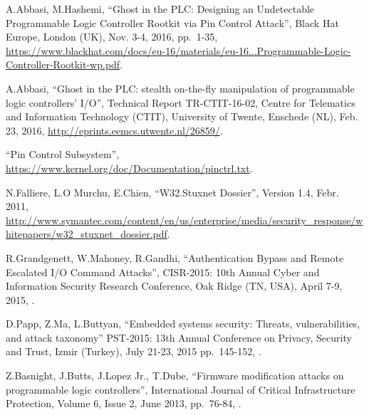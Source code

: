 \begin{thebibliography}{99}

A.Abbasi, M.Hashemi,
``Ghost in the PLC: Designing an Undetectable Programmable Logic Controller Rootkit via Pin Control Attack'',
Black Hat Europe,
London (UK), Nov. 3-4, 2016,
pp.\ 1-35,
\href{https://www.blackhat.com/docs/eu-16/materials/eu-16-Abbasi-Ghost-In-The-PLC-Designing-An-Undetectable-Programmable-Logic-Controller-Rootkit-wp.pdf}{https://www.blackhat.com/docs/eu-16/materials/eu-16...Programmable-Logic-Controller-Rootkit-wp.pdf}.


A.Abbasi,
``Ghost in the PLC: stealth on-the-fly manipulation of programmable logic controllers’ I/O'',
Technical Report TR-CTIT-16-02, Centre for Telematics and Information Technology (CTIT), University of Twente,
Enschede (NL), Feb. 23, 2016,
\url{http://eprints.eemcs.utwente.nl/26859/}.

``Pin Control Subsystem'',
\url{https://www.kernel.org/doc/Documentation/pinctrl.txt}.

N.Falliere, L.O Murchu, E.Chien,
``W32.Stuxnet  Dossier'',
Version 1.4, Febr. 2011,
\url{http://www.symantec.com/content/en/us/enterprise/media/security_response/whitepapers/w32_stuxnet_dossier.pdf}.

R.Grandgenett, W.Mahoney, R.Gandhi,
``Authentication Bypass and Remote Escalated I/O Command Attacks'',
CISR-2015: 10th Annual Cyber and Information Security Research Conference,
Oak Ridge (TN, USA), April 7-9, 2015,
.

D.Papp, Z.Ma, L.Buttyan,
``Embedded systems security: Threats, vulnerabilities, and attack taxonomy''
PST-2015: 13th Annual Conference on Privacy, Security and Trust,
Izmir (Turkey), July 21-23, 2015
pp.\ 145-152,
.

Z.Basnight, J.Butts, J.Lopez Jr., T.Dube,
``Firmware modification attacks on programmable logic controllers'',
International Journal of Critical Infrastructure Protection,
Volume 6, Issue 2, June 2013,
pp.\ 76-84,
.


\end{thebibliography}
